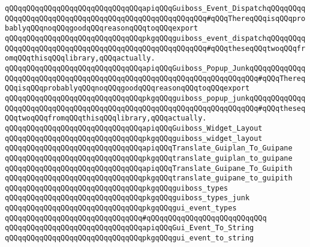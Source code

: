 \newline
\verb|qQQqqQQqqQQqqQQqqQQqqQQqqQQqqQQqapiqQQqGuiboss_Event_DispatchqQQqqQQqqQQqqQQqqQQqqQQqqQQqqQQqqQQqqQQqqQQqqQQqqQQqqQQq#qQQqThereqQQqisqQQqprobablyqQQqnoqQQqgoodqQQqreasonqQQqtoqQQqexport|\newline
\verb|qQQqqQQqqQQqqQQqqQQqqQQqqQQqqQQqpkgqQQqguiboss_event_dispatchqQQqqQQqqQQqqQQqqQQqqQQqqQQqqQQqqQQqqQQqqQQqqQQqqQQqqQQq#qQQqtheseqQQqtwoqQQqfromqQQqthisqQQqlibrary,qQQqactually.|\newline
\newline
\verb|qQQqqQQqqQQqqQQqqQQqqQQqqQQqqQQqapiqQQqGuiboss_Popup_JunkqQQqqQQqqQQqqQQqqQQqqQQqqQQqqQQqqQQqqQQqqQQqqQQqqQQqqQQqqQQqqQQqqQQqqQQq#qQQqThereqQQqisqQQqprobablyqQQqnoqQQqgoodqQQqreasonqQQqtoqQQqexport|\newline
\verb|qQQqqQQqqQQqqQQqqQQqqQQqqQQqqQQqpkgqQQqguiboss_popup_junkqQQqqQQqqQQqqQQqqQQqqQQqqQQqqQQqqQQqqQQqqQQqqQQqqQQqqQQqqQQqqQQqqQQqqQQq#qQQqtheseqQQqtwoqQQqfromqQQqthisqQQqlibrary,qQQqactually.|\newline
\newline
\verb|qQQqqQQqqQQqqQQqqQQqqQQqqQQqqQQqapiqQQqGuiboss_Widget_Layout|\newline
\verb|qQQqqQQqqQQqqQQqqQQqqQQqqQQqqQQqpkgqQQqguiboss_widget_layout|\newline
\newline
\verb|qQQqqQQqqQQqqQQqqQQqqQQqqQQqqQQqapiqQQqTranslate_Guiplan_To_Guipane|\newline
\verb|qQQqqQQqqQQqqQQqqQQqqQQqqQQqqQQqpkgqQQqtranslate_guiplan_to_guipane|\newline
\newline
\verb|qQQqqQQqqQQqqQQqqQQqqQQqqQQqqQQqapiqQQqTranslate_Guipane_To_Guipith|\newline
\verb|qQQqqQQqqQQqqQQqqQQqqQQqqQQqqQQqpkgqQQqtranslate_guipane_to_guipith|\newline
\newline
\verb|qQQqqQQqqQQqqQQqqQQqqQQqqQQqqQQqpkgqQQqguiboss_types|\newline
\verb|qQQqqQQqqQQqqQQqqQQqqQQqqQQqqQQqpkgqQQqguiboss_types_junk|\newline
\verb|qQQqqQQqqQQqqQQqqQQqqQQqqQQqqQQqpkgqQQqgui_event_types|\newline
\verb|qQQqqQQqqQQqqQQqqQQqqQQqqQQqqQQq#qQQqqQQqqQQqqQQqqQQqqQQqqQQq|\newline
\verb|qQQqqQQqqQQqqQQqqQQqqQQqqQQqqQQqapiqQQqGui_Event_To_String|\newline
\verb|qQQqqQQqqQQqqQQqqQQqqQQqqQQqqQQqpkgqQQqgui_event_to_string|\newline
